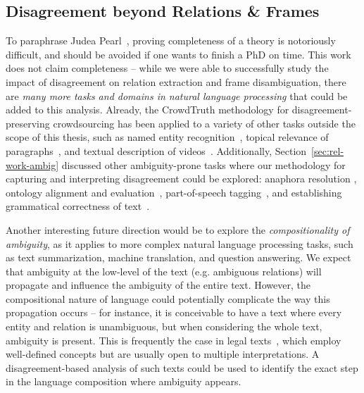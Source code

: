 \subsection{Disagreement beyond Relations \& Frames}


To paraphrase Judea Pearl~\cite{pearl2018book}, proving completeness of a theory is notoriously difficult, and should be avoided if one wants to finish a PhD on time. This work does not claim completeness -- while we were able to successfully study the impact of disagreement on relation extraction and frame disambiguation, there are \textit{many more tasks and domains in natural language processing} that could be added to this analysis. Already, the CrowdTruth methodology for disagreement-preserving crowdsourcing has been applied to a variety of other tasks outside the scope of this thesis, such as named entity recognition~\cite{inel2017harnessing}, topical relevance of paragraphs~\cite{inel2018studying}, and textual description of videos~\cite{inel2018study}. Additionally, Section~\ref{sec:rel-work-ambig} discussed other ambiguity-prone tasks where our methodology for capturing and interpreting disagreement could be explored: anaphora resolution \cite{poesio2005reliability}, ontology alignment and evaluation~\cite{cheatham2014conference}, part-of-speech tagging~\cite{plank-hovy-sogaard:2014:P14-2}, and establishing grammatical correctness of text~\cite{lau2014measuring}.

Another interesting future direction would be to explore the \textit{compositionality of ambiguity}, as it applies to more complex natural language processing tasks, such as text summarization, machine translation, and question answering. We expect that ambiguity at the low-level of the text (e.g. ambiguous relations) will propagate and influence the ambiguity of the entire text. However, the compositional nature of language could potentially complicate the way this propagation occurs -- for instance, it is conceivable to have a text where every entity and relation is unambiguous, but when considering the whole text, ambiguity is present. This is frequently the case in legal texts~\cite{edelman1992legal}, which employ well-defined concepts but are usually open to multiple interpretations. A disagreement-based analysis of such texts could be used to identify the exact step in the language composition where ambiguity appears.

